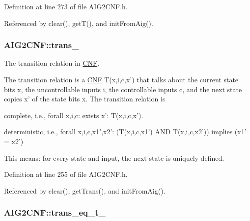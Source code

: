 Definition at line 273 of file A\-I\-G2\-C\-N\-F.\-h.



Referenced by clear(), get\-T(), and init\-From\-Aig().

\hypertarget{classAIG2CNF_aedcb9a8efe69fe03721fdc17c5d11bfc}{
\subsubsection[{trans\-\_\-}]{ A\-I\-G2\-C\-N\-F\-::trans\-\_\-\hspace{0.3cm}{\ttfamily [protected]}}}\label{classAIG2CNF_aedcb9a8efe69fe03721fdc17c5d11bfc}


The transition relation in \hyperlink{classCNF}{C\-N\-F}. 

The transition relation is a \hyperlink{classCNF}{C\-N\-F} T(x,i,c,x') that talks about the current state bits x, the uncontrollable inputs i, the controllable inputs c, and the next state copies x' of the state bits x. The transition relation is 
\begin{DoxyItemize}
\item complete, i.\-e., forall x,i,c\-: exists x'\-: T(x,i,c,x'). 
\item deterministic, i.\-e., forall x,i,c,x1',x2'\-: (T(x,i,c,x1') A\-N\-D T(x,i,c,x2')) implies (x1' = x2') 
\end{DoxyItemize}This means\-: for every state and input, the next state is uniquely defined. 

Definition at line 255 of file A\-I\-G2\-C\-N\-F.\-h.



Referenced by clear(), get\-Trans(), and init\-From\-Aig().

\hypertarget{classAIG2CNF_af7e9b65092f626865a4aa541a48e4f1b}{
\subsubsection[{trans\-\_\-eq\-\_\-t\-\_\-}]{ A\-I\-G2\-C\-N\-F\-::trans\-\_\-eq\-\_\-t\-\_\-\hspace{0.3cm}{\ttfamily [protected]}}}\label{classAIG2CNF_af7e9b65092f626865a4aa541a48e4f1b}


